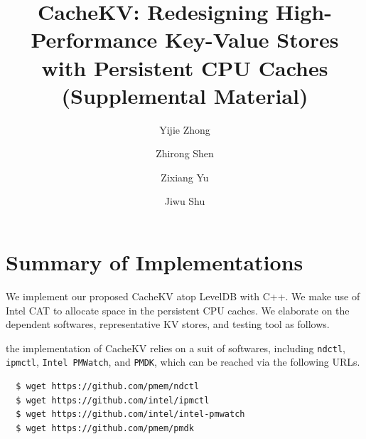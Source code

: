 \documentclass[sigconf, nonacm]{acmart}
\newcommand\sysname{\textsf{CacheKV}\xspace}
\renewcommand{\paragraph}[1]{\smallskip\noindent {\bf #1}}
\begin{document}

\date{}

\title{CacheKV: Redesigning High-Performance Key-Value Stores with Persistent CPU Caches (Supplemental Material)}
\author{Yijie Zhong}

\author{Zhirong Shen}

\author{Zixiang Yu}

\author{Jiwu Shu}
\maketitle



\section{Summary of Implementations}

We implement our proposed \sysname atop LevelDB \cite{leveldb} with C++.
We make use of Intel CAT \cite{cat} to allocate space in
the persistent CPU caches. We elaborate on the dependent softwares,
representative KV stores, and testing tool as follows.

\paragraph{Dependent softwares:} the implementation of
\sysname relies on a suit of softwares, including 
{\tt ndctl}, {\tt ipmctl}, {\tt Intel PMWatch}, and {\tt PMDK},
which can be reached via the following URLs.

\begin{verbatim}
  $ wget https://github.com/pmem/ndctl
  $ wget https://github.com/intel/ipmctl
  $ wget https://github.com/intel/intel-pmwatch
  $ wget https://github.com/pmem/pmdk
\end{verbatim}
\end{document}
